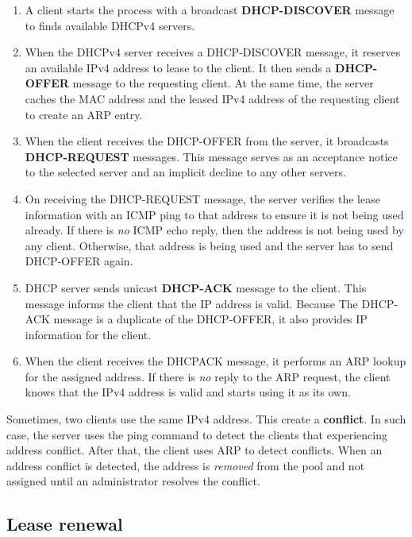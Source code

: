 \begin{enumerate}
\item A client starts the process with a broadcast \textbf{DHCP-DISCOVER} message to finds available DHCPv4 servers.

\item When the DHCPv4 server receives a DHCP-DISCOVER message, it reserves an available IPv4 address to lease to the client. It then sends a \textbf{DHCP-OFFER} message to the requesting client. At the same time, the server caches the MAC address and the leased IPv4 address of the requesting client to create an ARP entry.

\item When the client receives the DHCP-OFFER from the server, it broadcasts \textbf{DHCP-REQUEST} messages. This message serves as an acceptance notice to the selected server and an implicit decline to any other servers.

\item On receiving the DHCP-REQUEST message, the server verifies the lease information with an ICMP ping to that address to ensure it is not being used already. If there is \emph{no} ICMP echo reply, then the address is not being used by any client. Otherwise, that address is being used and the server has to send DHCP-OFFER again.

\item DHCP server sends  unicast \textbf{DHCP-ACK} message to the client. This message informs the client that the IP address is valid. Because The DHCP-ACK message is a duplicate of the DHCP-OFFER, it also provides IP information for the client.

\item When the client receives the DHCPACK message, it performs an ARP lookup for the assigned address. If there is \emph{no} reply to the ARP request, the client knows that the IPv4 address is valid and starts using it as its own.
\end{enumerate}

Sometimes, two clients use the same IPv4 address. This create a \textbf{conflict}. In such case, the server uses the ping command to detect the clients that experiencing address conflict. After that, the client uses ARP to detect conflicts. When an address conflict is detected, the address is \emph{removed} from the pool and not assigned until an administrator resolves the conflict. 

\subsection{Lease renewal}

